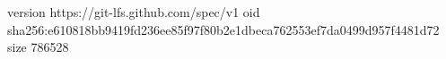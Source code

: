 version https://git-lfs.github.com/spec/v1
oid sha256:e610818bb9419fd236ee85f97f80b2e1dbeca762553ef7da0499d957f4481d72
size 786528
